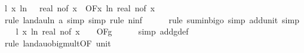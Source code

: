 \begin{isabellebody}
\ l{}{\isacharcolon}{\kern0pt}\ {\isachardoublequoteopen}{\isacharparenleft}{\kern0pt}{\isasymlambda}x{\isachardot}{\kern0pt}\ ln\ {\isacharparenleft}{\kern0pt}{}{}\ {\isacharplus}{\kern0pt}\ real\ {\isacharparenleft}{\kern0pt}n{\isacharunderscore}{\kern0pt}of\ x{\isacharparenright}{\kern0pt}{\isacharparenright}{\kern0pt}{\isacharparenright}{\kern0pt}\ {\isasymin}\ O{\isacharbrackleft}{\kern0pt}{\isacharquery}{\kern0pt}F{\isacharbrackright}{\kern0pt}{\isacharparenleft}{\kern0pt}{\isasymlambda}x{\isachardot}{\kern0pt}\ ln\ {\isacharparenleft}{\kern0pt}real\ {\isacharparenleft}{\kern0pt}n{\isacharunderscore}{\kern0pt}of\ x{\isacharparenright}{\kern0pt}{\isacharparenright}{\kern0pt}{\isacharparenright}{\kern0pt}{\isachardoublequoteclose}\isanewline
\ \ \ \ \isamarkupfalse%
\ {\isacharparenleft}{\kern0pt}rule\ landau{\isacharunderscore}{\kern0pt}ln{\isacharunderscore}{\kern0pt}{}{\isacharbrackleft}{\kern0pt}\ a{\isacharequal}{\kern0pt}{\isachardoublequoteopen}{}{\isachardoublequoteclose}{\isacharbrackright}{\kern0pt}{\isacharcomma}{\kern0pt}\ simp{\isacharcomma}{\kern0pt}\ simp{\isacharcomma}{\kern0pt}\ rule\ n{\isacharunderscore}{\kern0pt}inf{\isacharparenright}{\kern0pt}\isanewline
\ \ \ \ \isamarkupfalse%
\ {\isacharparenleft}{\kern0pt}rule\ sum{\isacharunderscore}{\kern0pt}in{\isacharunderscore}{\kern0pt}bigo{\isacharcomma}{\kern0pt}\ simp\ add{\isacharcolon}{\kern0pt}unit{\isacharunderscore}{\kern0pt}{}{\isacharcomma}{\kern0pt}\ simp{\isacharparenright}{\kern0pt}\isanewline
\isanewline
\ \ \isamarkupfalse%
\ l{}{\isacharcolon}{\kern0pt}\ {\isachardoublequoteopen}{\isacharparenleft}{\kern0pt}{\isasymlambda}x{\isachardot}{\kern0pt}\ ln\ {\isacharparenleft}{\kern0pt}real\ {\isacharparenleft}{\kern0pt}n{\isacharunderscore}{\kern0pt}of\ x{\isacharparenright}{\kern0pt}\ {\isacharplus}{\kern0pt}\ {}{}{\isacharparenright}{\kern0pt}{\isacharparenright}{\kern0pt}\ {\isasymin}\ O{\isacharbrackleft}{\kern0pt}{\isacharquery}{\kern0pt}F{\isacharbrackright}{\kern0pt}{\isacharparenleft}{\kern0pt}g{\isacharparenright}{\kern0pt}{\isachardoublequoteclose}\isanewline
\ \ \ \ \isamarkupfalse%
\ {\isacharparenleft}{\kern0pt}simp\ add{\isacharcolon}{\kern0pt}g{\isacharunderscore}{\kern0pt}def{\isacharparenright}{\kern0pt}\isanewline
\ \ \ \ \isamarkupfalse%
\ {\isacharparenleft}{\kern0pt}rule\ landau{\isacharunderscore}{\kern0pt}o{\isachardot}{\kern0pt}big{\isacharunderscore}{\kern0pt}mult{\isacharunderscore}{\kern0pt}{}{\isacharprime}{\kern0pt}{\isacharbrackleft}{\kern0pt}OF\ unit{\isacharunderscore}{\kern0pt}{}{\isacharbrackright}{\kern0pt}{\isacharparenright}{\kern0pt}\isanewline

\end{isabellebody}
